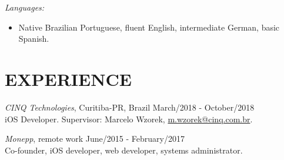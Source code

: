 \documentclass[margin]{res}
\begin{document}
\begin{resume}
			{\sl Languages:}
			\begin{itemize}
				\item[] Native Brazilian Portuguese, fluent English, intermediate German, basic Spanish.
			\end{itemize}

 		\section{EXPERIENCE}
 			{\sl CINQ Technologies}, Curitiba-PR, Brazil \hfill March/2018 - October/2018 \\
 			iOS Developer.
			Supervisor: Marcelo Wzorek, \href{mailto:m.wzorek@cinq.com.br}{m.wzorek@cinq.com.br}.

 			{\sl Monepp}, remote work \hfill June/2015 - February/2017 \\
			Co-founder, iOS developer, web developer, systems administrator.
 			 		

\end{resume}
\end{document}
